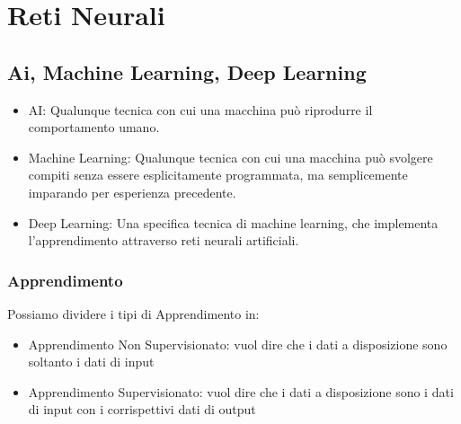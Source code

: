 \chapter{Reti Neurali}
\section{Ai, Machine Learning, Deep Learning}

\begin{itemize}
    \item AI: Qualunque tecnica con cui una macchina può riprodurre il comportamento umano.
    \item Machine Learning: Qualunque tecnica con cui una macchina può svolgere compiti senza essere esplicitamente programmata, ma semplicemente imparando per esperienza precedente.
    \item Deep Learning: Una specifica tecnica di machine learning, che implementa l’apprendimento attraverso reti neurali artificiali.
\end{itemize}

\subsection{Apprendimento}
Possiamo dividere i tipi di Apprendimento in:
\begin{itemize}
    \item Apprendimento Non Supervisionato: vuol dire che i dati a disposizione sono soltanto i dati di input
    \item Apprendimento Supervisionato: vuol dire che i dati a disposizione sono i dati di input con i corrispettivi dati di output
\end{itemize}


